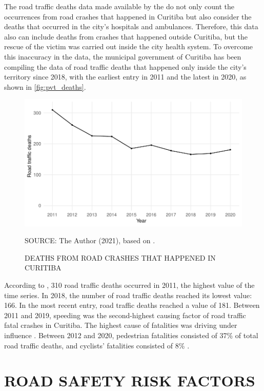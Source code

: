 The road traffic deaths data made available by the \textcite{MinistryofHealth2020} do not only count the occurrences from road crashes that happened in Curitiba but also consider the deaths that occurred in the city's hospitals and ambulances. Therefore, this data also can include deaths from crashes that happened outside Curitiba, but the rescue of the victim was carried out inside the city health system. To overcome this inaccuracy in the data, the municipal government of Curitiba has been compiling the data of road traffic deaths that happened only inside the city's territory since 2018, with the earliest entry in 2011 and the latest in 2020, as shown in \autoref{fig:pvt_deaths}.  

\begin{figure}[!htbp]
    \centering\footnotesize
    \captionsetup{font=footnotesize}
    \caption{DEATHS FROM ROAD CRASHES THAT HAPPENED IN CURITIBA}
    \includegraphics{fig/pvt_plot.pdf}
    \label{fig:pvt_deaths}
    \par SOURCE: The Author (2021), based on \textcite{Curitiba2021}.
\end{figure} 

According to \textcite{Curitiba2021}, 310 road traffic deaths occurred in 2011, the highest value of the time series. In 2018, the number of road traffic deaths reached its lowest value: 166. In the most recent entry, road traffic deaths reached a value of 181. Between 2011 and 2019, speeding was the second-highest causing factor of road traffic fatal crashes in Curitiba. The highest cause of fatalities was driving under influence \cite{Curitiba2020}. Between 2012 and 2020, pedestrian fatalities consisted of 37\% of total road traffic deaths, and cyclists' fatalities consisted of 8\% \cite{Curitiba2021}.

\section{ROAD SAFETY RISK FACTORS} \label{sec:risk}

